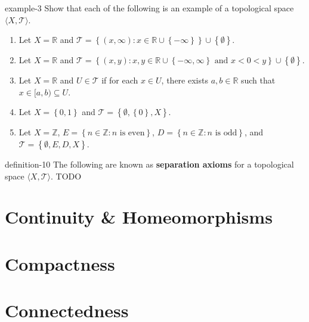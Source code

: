 \documentclass[10pt,]{article}
\newcommand{\terminology}[1]{\textbf{#1}}
\newcommand{\tuple}[1]{\langle #1 \rangle}
\newcommand{\mb}{\mathbb}
\newcommand{\mc}{\mathcal}
\newcommand{\setBuilder}[2]{\left\{#1:#2\right\}}
\newcommand{\setList}[1]{\left\{#1\right\}}
\newcommand{\lt}{<}
\begin{document}
\begin{example}{}{example-3}%
\hypertarget{p-35}{}%
Show that each of the following is an example of a topological space \(\tuple{X,\mc T}\).%
\leavevmode%
\begin{enumerate}
\item\hypertarget{li-23}{}Let \(X=\mb R\) and \(\mc T=\setBuilder{(x,\infty)}{x\in\mb R\cup\setList{-\infty}}
\cup\setList{\emptyset}\).%
\item\hypertarget{li-24}{}Let \(X=\mb R\) and \(\mc T=\setBuilder{(x,y)}{
x,y\in\mb R\cup\setList{-\infty,\infty} \text{ and }x\lt 0\lt y
}\cup\setList{\emptyset}\).%
\item\hypertarget{li-25}{}Let \(X=\mb R\) and \(U\in\mc T\) if for each \(x\in U\), there exists \(a,b\in\mb R\) such that \(x\in[a,b)\subseteq U\).%
\item\hypertarget{li-26}{}Let \(X=\setList{0,1}\) and \(\mc T=\setList{\emptyset,\setList{0},X}\).%
\item\hypertarget{li-27}{}Let \(X=\mb Z\), \(E=\setBuilder{n\in\mb Z}{n\text{ is even}}\), \(D=\setBuilder{n\in\mb Z}{n\text{ is odd}}\), and \(\mc T=\setList{\emptyset,E,D,X}\).%
\end{enumerate}
\end{example}
\begin{definition}{}{definition-10}%
\hypertarget{p-36}{}%
The following are known as \terminology{separation axioms} for a topological space \(\tuple{X,\mc T}\). TODO%
\end{definition}
%
%
\typeout{************************************************}
\typeout{************************************************}
%
\section[{Continuity \& Homeomorphisms}]{Continuity \& Homeomorphisms}\label{section-continuity}
%
%
\typeout{************************************************}
\typeout{************************************************}
%
\section[{Compactness}]{Compactness}\label{section-compactness}
%
%
\typeout{************************************************}
\typeout{************************************************}
%
\section[{Connectedness}]{Connectedness}\label{section-connectedness}
%
%
\typeout{************************************************}
\typeout{************************************************}
%
\end{document}
